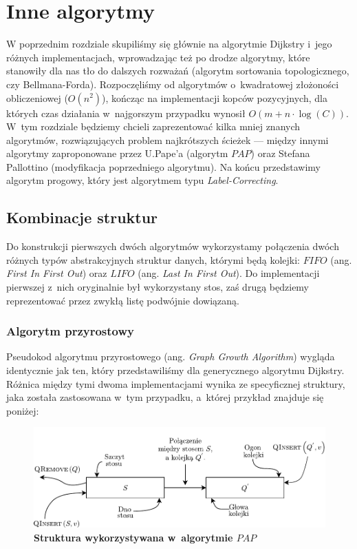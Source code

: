 \chapter{Inne algorytmy}

W poprzednim rozdziale skupiliśmy się głównie na algorytmie Dijkstry i~jego różnych implementacjach, wprowadzając też po drodze algorytmy, które stanowiły dla nas tło do dalszych rozważań (algorytm sortowania topologicznego, czy Bellmana-Forda). Rozpoczęliśmy od algorytmów o~kwadratowej złożoności obliczeniowej ($O \left( n^{2} \right)$), kończąc na implementacji kopców pozycyjnych, dla których czas działania w~najgorszym przypadku wynosił $O \left( m + n \cdot \log \left( C \right) \right) $. W~tym rozdziale będziemy chcieli zaprezentować kilka mniej znanych algorytmów, rozwiązujących problem najkrótszych ścieżek --- między innymi algorytmy zaproponowane przez U.Pape'a (algorytm $PAP$) oraz Stefana Pallottino (modyfikacja poprzedniego algorytmu). Na końcu przedstawimy algorytm progowy, który jest algorytmem typu \textit{Label-Correcting}.

\section{Kombinacje struktur}

Do konstrukcji pierwszych dwóch algorytmów wykorzystamy połączenia dwóch różnych typów abstrakcyjnych struktur danych, którymi będą kolejki: $FIFO$ (ang. \textit{First In First Out}) oraz $LIFO$ (ang. \textit{Last In First Out}). Do implementacji pierwszej z~nich oryginalnie był wykorzystany stos, zaś drugą będziemy reprezentować przez zwykłą listę podwójnie dowiązaną.

\subsection{Algorytm przyrostowy}

Pseudokod algorytmu przyrostowego (ang. \textit{Graph Growth Algorithm}) wygląda identycznie jak ten, który przedstawiliśmy dla generycznego algorytmu Dijkstry. Różnica między tymi dwoma implementacjami wynika ze specyficznej struktury, jaka została zastosowana w~tym przypadku, a~której przykład znajduje się poniżej:


\begin{figure}[!htbp]
	\centering
	\includegraphics[width=\textwidth]{Chapter_III/GRAPH-GROWTH-1Q-Other/a.pdf}
	\caption{\textbf{Struktura wykorzystywana w~algorytmie $PAP$}} \label{fig:examplePAPStructure}
\end{figure}


